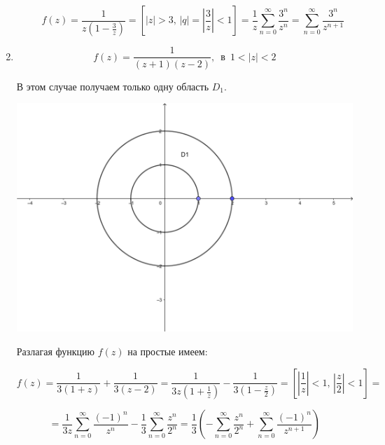\documentclass[../../main.tex]{subfiles}
\begin{document}
\begin{exmp}
\begin{enumerate}
\begin{enumerate}
			\[ f(z) = \frac{1}{z(1 - \frac{3}{z})} = \left[ |z| > 3,\, |q| = |\frac{3}{z}| < 1 \right] = \frac{1}{z} \sum\limits_{n = 0}^{\infty} \frac{3^n}{z^n} = \sum\limits_{n = 0}^{\infty} \frac{3^n}{z^{n + 1}} \]
		\end{enumerate}
	
		\item \[ f(z) = \frac{1}{(z + 1)(z - 2)},\, \text{ в }\, 1 < |z| < 2 \]
		
		В этом случае получаем только одну область $ D_1 $.
		
		\begin{center}
			\includegraphics[scale = 0.8]{lec34_2} 
		\end{center}
	
		Разлагая функцию $ f(z) $ на простые имеем:
		
		\[ f(z) = \frac{1}{3(1 + z)} + \frac{1}{3(z - 2)} = \frac{1}{3z(1 + \frac{1}{z})} - \frac{1}{3(1 - \frac{z}{2})} = \left[ |\frac{1}{z}| < 1,\, |\frac{z}{2}| < 1 \right] = \]
		
		\[ = \frac{1}{3z} \sum\limits_{n = 0}^{\infty} \frac{(-1)^n}{z^n} - \frac{1}{3} \sum\limits_{n = 0}^{\infty} \frac{z^n}{2^n} = \frac{1}{3} \left( -\sum\limits_{n = 0}^{\infty} \frac{z^n}{2^n} + \sum\limits_{n = 0}^{\infty} \frac{(-1)^n}{z^{n + 1}} \right) \]
	\end{enumerate}
\end{exmp}
\end{document}
